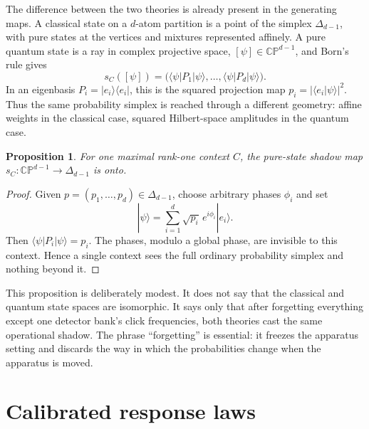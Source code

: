 \documentclass[aps,pra,reprint,superscriptaddress,nofootinbib,floatfix]{revtex4-2}
\newtheorem{proposition}{Proposition}
\begin{document}
The difference between the two theories is already present in the generating
maps.  A classical state on a \(d\)-atom partition is a point of the simplex
\(\Delta_{d-1}\), with pure states at the vertices and mixtures represented
affinely.  A pure quantum state is a ray in complex projective space,
\([\psi]\in\mathbb{CP}^{d-1}\), and Born's rule gives
\begin{equation}
        s_C([\psi]) =
        \bigl(\langle\psi|P_1|\psi\rangle,\ldots,
        \langle\psi|P_d|\psi\rangle\bigr).
        \label{eq:shadow-map}
\end{equation}
In an eigenbasis \(P_i=|e_i\rangle\langle e_i|\), this is the squared
projection map \(p_i=|\langle e_i|\psi\rangle|^2\).  Thus the same probability
simplex is reached through a different geometry: affine weights in the
classical case, squared Hilbert-space amplitudes in the quantum case.

\begin{proposition}
For one maximal rank-one context \(C\), the pure-state shadow map
\(s_C:\mathbb{CP}^{d-1}\to\Delta_{d-1}\) is onto.
\end{proposition}

\begin{proof}
Given \(p=(p_1,\ldots,p_d)\in\Delta_{d-1}\), choose arbitrary phases
\(\phi_i\) and set
\begin{equation}
        |\psi\rangle
        =
        \sum_{i=1}^d \sqrt{p_i}\,e^{i\phi_i}|e_i\rangle .
\end{equation}
Then \(\langle\psi|P_i|\psi\rangle=p_i\).  The phases, modulo a global phase,
are invisible to this context.  Hence a single context sees the full ordinary
probability simplex and nothing beyond it.
\end{proof}

This proposition is deliberately modest.  It does not say that the classical
and quantum state spaces are isomorphic.  It says only that after forgetting
everything except one detector bank's click frequencies, both theories cast
the same operational shadow.  The phrase ``forgetting'' is essential: it
freezes the apparatus setting and discards the way in which the probabilities
change when the apparatus is moved.

\section{Calibrated response laws}
\end{document}
